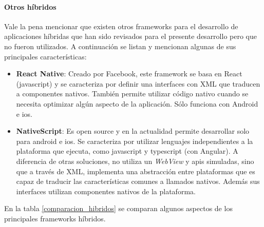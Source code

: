 
\paragraph{Otros  híbridos}
\label{otros_frameworks_hibridos}

Vale la pena mencionar que existen otros \glspl{framework} para el desarrollo de aplicaciones híbridas que han sido revisados para el presente desarrollo pero que no fueron utilizados. A continuación se listan y mencionan algunas de sus principales características:
\begin{itemize}
\item \textbf{React Native}: Creado por Facebook, este \gls{framework} se basa en React (\gls{javascript}) y se caracteriza por definir una interfaces con \gls{XML} que traducen a componentes nativos. También permite utilizar código nativo cuando se necesita optimizar algún aspecto de la aplicación. Sólo funciona con Android e \gls{ios}.
\item \textbf{NativeScript}: Es \gls{open source} y en la actualidad permite desarrollar solo para \gls{android} e \gls{ios}. Se caracteriza por utilizar lenguajes independientes a la plataforma que ejecuta, como \gls{javascript} y \gls{typescript} (con Angular). A diferencia de otras soluciones, no utiliza un \textit{WebView} y \glspl{api} simuladas, sino que a través de \gls{XML}, implementa una abstracción entre plataformas que es capaz de traducir las características comunes a llamados nativos\cite{nativescript2017basics}. Además sus interfaces utilizan componentes nativos de la plataforma.
\end{itemize}

En la tabla \ref{comparacion_hibridos} se comparan algunos aspectos de los principales \glspl{framework} híbridos.

